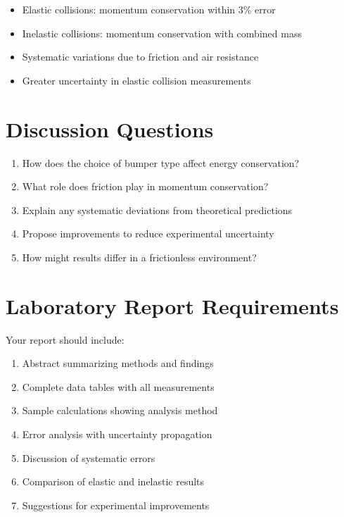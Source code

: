 \documentclass[12pt]{article}
\newcommand{\conceptbox}[2]{
    \begin{tcolorbox}[colback=blue!5,colframe=blue!40,title={\textbf{#1}}]
        #2
    \end{tcolorbox}
}
\begin{document}
\conceptbox{Anticipated Outcomes}{
\begin{itemize}
    \item Elastic collisions: momentum conservation within 3\% error
    \item Inelastic collisions: momentum conservation with combined mass
    \item Systematic variations due to friction and air resistance
    \item Greater uncertainty in elastic collision measurements
\end{itemize}
}

\section{Discussion Questions}
\begin{enumerate}
    \item How does the choice of bumper type affect energy conservation?
    \item What role does friction play in momentum conservation?
    \item Explain any systematic deviations from theoretical predictions
    \item Propose improvements to reduce experimental uncertainty
    \item How might results differ in a frictionless environment?
\end{enumerate}

\section{Laboratory Report Requirements}

Your report should include:

\begin{enumerate}
    \item Abstract summarizing methods and findings
    \item Complete data tables with all measurements
    \item Sample calculations showing analysis method
    \item Error analysis with uncertainty propagation
    \item Discussion of systematic errors
    \item Comparison of elastic and inelastic results
    \item Suggestions for experimental improvements
\end{enumerate}
\end{document}

